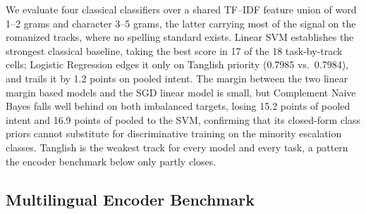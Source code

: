 We evaluate four classical classifiers over a shared TF--IDF feature union of word 1--2 grams and character 3--5 grams, the latter carrying most of the signal on the romanized tracks, where no spelling standard exists. Linear SVM establishes the strongest classical baseline, taking the best score in 17 of the 18 task-by-track cells; Logistic Regression edges it only on Tanglish priority (0.7985 vs.\ 0.7984), and trails it by 1.2 points on pooled intent. The margin between the two linear margin based models and the SGD linear model is small, but Complement Naive Bayes falls well behind on both imbalanced targets, losing 15.2 points of pooled intent \macrof{} and 16.9 points of pooled \negf{} to the SVM, confirming that its closed-form class priors cannot substitute for discriminative training on the minority escalation classes. Tanglish is the weakest track for every model and every task, a pattern the encoder benchmark below only partly closes.

\subsection{Multilingual Encoder Benchmark}

